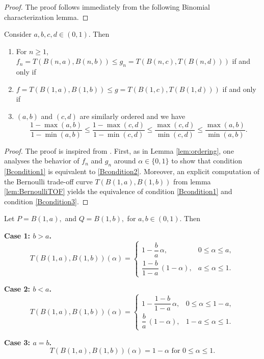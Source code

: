 \begin{proof}
    The proof follows immediately from the following Binomial characterization lemma. 
\end{proof}
\begin{lemma} \label{lem:Binom}
    Consider $a,b,c,d \in (0,1)$. Then 
    \begin{enumerate}
        \item For $n\geq 1$, $f_n = T(B(n,a), B(n,b)) \leq g_n=T(B(n,c), T(B(n,d)))$ if and only if  \label{Bcondition1}
        \item  $f= T(B(1,a), B(1,b)) \leq g= T(B(1,c), T(B(1,d)))$ if and only if  \label{Bcondition2}
        \item $(a,b)$ and $(c,d)$ are similarly ordered and we have \label{Bcondition3}
        \begin{equation} \label{eq:Binomcondition}
            \frac{1-\max(a,b)}{1-\min(a,b)} \leq \frac{1-\max(c,d)}{1-\min(c,d)} \leq \frac{\max(c,d)}{\min(c,d)} \leq \frac{\max(a,b)}{\min(a,b)}.  
        \end{equation}
    \end{enumerate}
\end{lemma}
\begin{proof}
    The proof  is inspired from \cite[Complement 16, Chapter 10]{torgersen1991comparison}. First, as in Lemma \ref{lem:ordering}, one analyses the behavior of $f_n$ and $g_n$ around $\alpha \in \{0,1\} $ to show that condition \ref{Bcondition1} is equivalent to \ref{Bcondition2}. Moreover, an explicit computation of the Bernoulli trade-off curve $T(B(1,a), B(1,b))$ from lemma \ref{lem:BernoulliTOF} yields the equivalence of condition \ref{Bcondition1} and condition \ref{Bcondition3}.
\end{proof}
\begin{lemma} \label{lem:BernoulliTOF} Let  $P=B(1,a),$ and $ Q=B(1,b),$ for $a,b\in(0,1).$ Then




\noindent\textbf{Case 1: \(b>a\).}
\[
T(B(1,a),B(1, b))(\alpha)
=
\begin{cases}
1-\dfrac{b}{a}\,\alpha,
& 0\le \alpha\le a,\\[1em]
\dfrac{1-b}{1-a}\,(1-\alpha),
& a\le \alpha\le 1.
\end{cases}
\]

\medskip

\noindent\textbf{Case 2: \(b<a\).}
\[
T(B(1,a),B(1,b))(\alpha)
=
\begin{cases}
1-\dfrac{1-b}{1-a}\,\alpha,
& 0\le \alpha\le 1-a,\\[1em]
\dfrac{b}{a}\,(1-\alpha),
& 1-a\le \alpha\le 1.
\end{cases}
\]

\medskip

\noindent\textbf{Case 3: \(a=b\).}
\[
T(B(1,a),B(1,b))(\alpha)
=
1-\alpha \text{ for } 0\leq \alpha \leq 1.
\]
\end{lemma}
